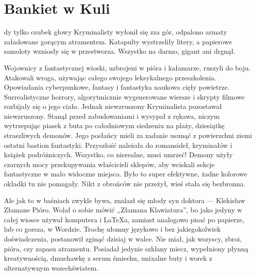 \chapter{Bankiet w Kuli}




dy tylko czubek głowy Kryminalisty wyłonił się zza gór, odpalono armaty załadowane gorącym atramentem.
Katapulty wystrzeliły litery, a papierowe samoloty wzniosły się w przestworza.
Wszystko na darmo, gigant ani drgnął.

Wojownicy z fantastycznej wioski, uzbrojeni w pióra i kałamarze, ruszyli do boju.
Atakowali wroga, używając całego swojego leksykalnego przeszkolenia. 
Opowiadania cyberpunkowe, fantasy i fantastyka naukowa cięły powietrze.
Surrealistyczne horrory, algorytmicznie wygenerowane wiersze i skrypty filmowe rozbijały się o jego ciało.
Jednak niewzruszony Kryminalista pozostawał niewzruszony.
Stanął przed zabudowaniami i wysypał z rękawa, niczym wytrzepując piasek z buta po całodniowym siedzeniu na plaży, dziesiątkę straszliwych demonów.
Jego posłańcy mieli za zadanie usunąć z powierzchni ziemi ostatni bastion fantastyki.
Przyszłość należała do romansideł, kryminałów i książek podróżniczych.
Wszystko, co nierealne, musi umrzeć!
Demony użyły czarnych mocy przekupywania właścicieli sklepów, aby wciskali sekcje fantastyczne w mało widoczne miejsca.
Było to super efektywne, żadne kolorowe okładki tu nie pomagały.
Nikt z obrońców nie przeżył, wieś stała się bezbronna.

Ale jak to w baśniach zwykle bywa, znalazł się młody syn doktora --- Klekisław Złamane Pióro.
Wolał o sobie mówić ,,Złamana Klawiatura'', bo jako jedyny w całej wiosce używał komputera i \LaTeX a, zamiast analogowo pisać po papierze, lub co gorsza,
w Wordzie.
Trochę ułomny językowo i bez jakiegokolwiek doświadczenia, postanowił zginąć dzisiaj w walce.
Nie miał, jak wszyscy, zbroi, pióra, czy zapasu atramentu.
Posiadał jedynie szklany miecz, wypełniony płynną kreatywnością, dmuchawkę z serum śmiechu, unixalne buty i worek z alternatywnym wszechświatem.

